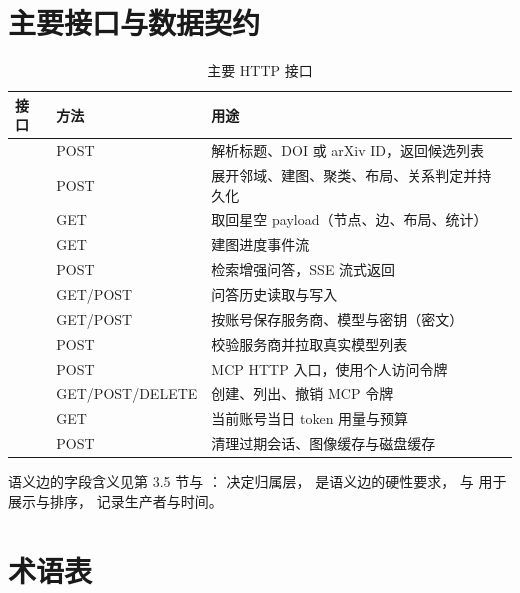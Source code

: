 \section{主要接口与数据契约}

\begin{table}[htbp]
  \centering
  \footnotesize
  \caption{主要 HTTP 接口}
  \label{tab:api}
  \begin{tabularx}{\textwidth}{L{4.4cm}L{3.2cm}Y}
    \toprule
\textbf{接口} & \textbf{方法} & \textbf{用途} \\
    \midrule
     & POST & 解析标题、DOI 或 arXiv ID，返回候选列表 \\
     & POST & 展开邻域、建图、聚类、布局、关系判定并持久化 \\
     & GET & 取回星空 payload（节点、边、布局、统计） \\
     & GET & 建图进度事件流 \\
     & POST & 检索增强问答，SSE 流式返回 \\
     & GET/POST & 问答历史读取与写入 \\
     & GET/POST & 按账号保存服务商、模型与密钥（密文） \\
     & POST & 校验服务商并拉取真实模型列表 \\
     & POST & MCP HTTP 入口，使用个人访问令牌 \\
     & GET/POST/DELETE & 创建、列出、撤销 MCP 令牌 \\
     & GET & 当前账号当日 token 用量与预算 \\
     & POST & 清理过期会话、图像缓存与磁盘缓存 \\
    \bottomrule
  \end{tabularx}
\end{table}

语义边的字段含义见第 3.5 节与 ： 决定归属层， 是语义边的硬性要求， 与  用于展示与排序， 记录生产者与时间。

\section{术语表}

